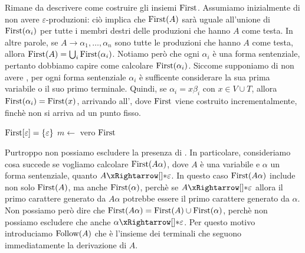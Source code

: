 Rimane da descrivere come costruire gli insiemi $\First$.
Assumiamo inizialmente di non avere $\varepsilon$-produzioni: ciò implica che $\operatorname{First}(A)$ sarà uguale all'unione di
$\operatorname{First}(\alpha_{i})$ per tutte i membri destri delle produzioni che hanno $A$ come testa.
In altre parole, se $A\to \alpha_{1},\ldots, \alpha_{n}$ sono tutte le produzioni che hanno $A$ come testa,
allora $\operatorname{First}(A) = \bigcup_{i} \operatorname{First}(\alpha_{i})$.
Notiamo però che ogni $\alpha_{i}$ è una forma sentenziale, pertanto dobbiamo capire come calcolare $\operatorname{First}(\alpha_{i})$.
Siccome supponiamo di non avere \epsprod, per ogni forma sentenziale $\alpha_{i}$ è sufficente considerare la sua prima
variabile o il suo primo terminale.
Quindi, se $\alpha_{i}=x\beta_{i}$ con $x\in V\cup T$, allora $\operatorname{First}(\alpha_{i}) = \operatorname{First}(x)$, arrivando
all', dove $\First$ viene costruito incrementalmente, finchè non si arriva
ad un punto fisso.


\begin{algorithm}[tb!]
\caption{Costruzione di $\First$ in assenza di \epsprod}
\label{alg:costruzione-first-no-eps-produzioni}
$\operatorname{First}[\varepsilon]=\{\varepsilon\}$\;
$m\gets$ vero\;
\Return $\First$
\end{algorithm}

Purtroppo non possiamo escludere la presenza di \epsprod.
In particolare, consideriamo cosa succede se vogliamo calcolare $\operatorname{First}(A\alpha)$, dove $A$ è una variabile e $\alpha$
un forma sentenziale, quanto $A\eprod{} \varepsilon$.
In questo caso $\operatorname{First}(A\alpha)$ include non solo $\operatorname{First}(A)$, ma anche $\operatorname{First}(\alpha)$, perchè se
$A\eprod{} \varepsilon$ allora il primo carattere generato da $A\alpha$ potrebbe essere il primo carattere generato da $\alpha$.
Non possiamo però dire che $\operatorname{First}(A\alpha) = \operatorname{First}(A) \cup \operatorname{First}(\alpha)$, perchè non possiamo escludere che anche
$\alpha \eprod{} \varepsilon$.
Per questo motivo introduciamo $\operatorname{Follow}(A)$ che è l'insieme dei terminali che seguono immediatamente la derivazione di $A$.

